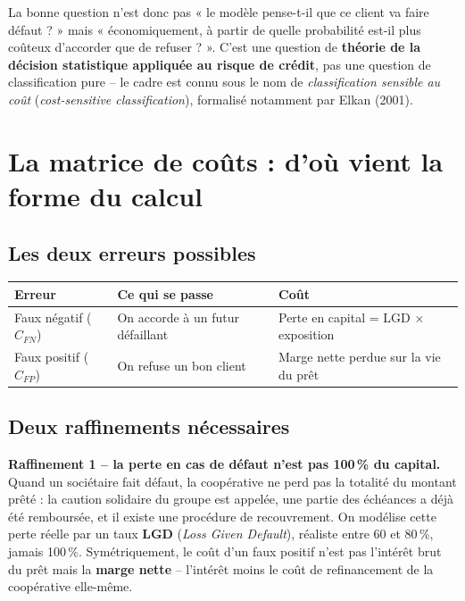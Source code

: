 \documentclass[11pt,a4paper]{article}
\begin{document}
La bonne question n'est donc pas « le modèle pense-t-il que ce client va faire défaut ? » mais
« économiquement, à partir de quelle probabilité est-il plus coûteux d'accorder que de
refuser ? ». C'est une question de \textbf{théorie de la décision statistique appliquée au
risque de crédit}, pas une question de classification pure -- le cadre est connu sous le nom de
\emph{classification sensible au coût} (\emph{cost-sensitive classification}), formalisé
notamment par Elkan (2001).

\section{La matrice de coûts : d'où vient la forme du calcul}

\subsection{Les deux erreurs possibles}

\begin{center}
\begin{tabular}{@{}L{4.2cm}L{5cm}L{5cm}@{}}
\toprule
\textbf{Erreur} & \textbf{Ce qui se passe} & \textbf{Coût} \\
\midrule
Faux négatif ($C_{FN}$) & On accorde à un futur défaillant & Perte en capital = LGD $\times$ exposition \\
Faux positif ($C_{FP}$) & On refuse un bon client & Marge nette perdue sur la vie du prêt \\
\bottomrule
\end{tabular}
\end{center}

\subsection{Deux raffinements nécessaires}

\textbf{Raffinement 1 -- la perte en cas de défaut n'est pas 100\,\% du capital.} Quand un
sociétaire fait défaut, la coopérative ne perd pas la totalité du montant prêté : la caution
solidaire du groupe est appelée, une partie des échéances a déjà été remboursée, et il existe une
procédure de recouvrement. On modélise cette perte réelle par un taux \textbf{LGD}
(\emph{Loss Given Default}), réaliste entre 60 et 80\,\%, jamais 100\,\%. Symétriquement, le coût
d'un faux positif n'est pas l'intérêt brut du prêt mais la \textbf{marge nette} -- l'intérêt moins
le coût de refinancement de la coopérative elle-même.
\end{document}
